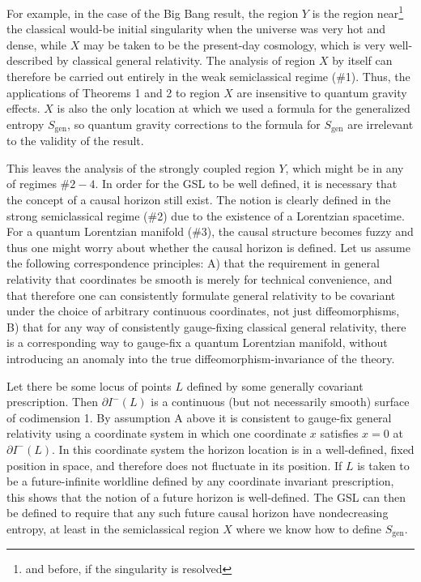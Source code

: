 \documentclass{article}
\begin{document}
For example, in the case of the Big Bang result, the region $Y$ is the region near\footnote{and before, if the singularity is resolved} the classical would-be initial singularity when the universe was very hot and dense, while $X$ may be taken to be the present-day cosmology, which is very well-described by classical general relativity.  The analysis of region $X$ by itself can therefore be carried out entirely in the weak semiclassical regime (\#1).  Thus, the applications of Theorems 1 and 2 to region $X$ are insensitive to quantum gravity effects.  $X$ is also the only location at which we used a formula for the generalized entropy $S_\mathrm{gen}$, so quantum gravity corrections to the formula for $S_\mathrm{gen}$ are irrelevant to the validity of the result.

This leaves the analysis of the strongly coupled region $Y$, which might be in any of regimes $\#2-4$.  In order for the GSL to be well defined, it is necessary that the concept of a causal horizon still exist.  The notion is clearly defined in the strong semiclassical regime (\#2) due to the existence of a Lorentzian spacetime.  For a quantum Lorentzian manifold (\#3), the causal structure becomes fuzzy and thus one might worry about whether the causal horizon is defined.  Let us assume the following correspondence principles: A) that the requirement in general relativity that coordinates be smooth is merely for technical convenience, and that therefore one can consistently formulate general relativity to be covariant under the choice of arbitrary continuous coordinates, not just diffeomorphisms, B) that for any way of consistently gauge-fixing classical general relativity, there is a corresponding way to gauge-fix a quantum Lorentzian manifold, without introducing an anomaly into the true diffeomorphism-invariance of the theory.

Let there be some locus of points $L$ defined by some generally covariant prescription.  Then $\partial I^-(L)$ is a continuous (but not necessarily smooth) surface of codimension 1.  By assumption A above it is consistent to gauge-fix general relativity using a coordinate system in which one coordinate $x$ satisfies $x = 0$ at $\partial I^-(L)$.  In this coordinate system the horizon location is in a well-defined, fixed position in space, and therefore does not fluctuate in its position.  If $L$ is taken to be a future-infinite worldline defined by any coordinate invariant prescription, this shows that the notion of a future horizon is well-defined.  The GSL can then be defined to require that any such future causal horizon have nondecreasing entropy, at least in the semiclassical region $X$ where we know how to define $S_\mathrm{gen}$.
\end{document}
